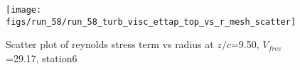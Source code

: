 \begin{figure}[H]
\centering
\texttt{[image: figs/run\_58/run\_58\_turb\_visc\_ettap\_top\_vs\_r\_mesh\_scatter]}
\caption{Scatter plot of reynolds stress term vs radius at $z/c$=9.50, $V_{free}$=29.17, station6}
\label{fig:run_58_turb_visc_ettap_top_vs_r_mesh_scatter}
\end{figure}


